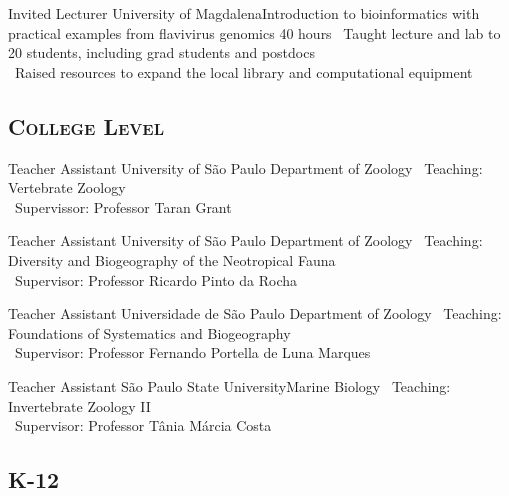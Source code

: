 \documentclass[11pt, letterpaper, sans]{moderncv}
\begin{document}
\vspace{.5em}

	{Invited Lecturer}
	{University of Magdalena}{Introduction to bioinformatics with practical examples from flavivirus genomics}
	{40 hours}
	{
		\textbullet~Taught lecture and lab to 20 students, including grad students and postdocs\\
		\textbullet~Raised resources to expand the local library and computational equipment
	}

	\subsection{\textsc{College Level}}
\vspace{.5em}

	{Teacher Assistant}
	{University of São Paulo}
	{Department of Zoology}
	{}
	{
		\textbullet~Teaching: Vertebrate Zoology\\
		\textbullet~Supervissor: Professor Taran Grant
	}

\vspace{.5em}

	{Teacher Assistant}
	{University of São Paulo}
	{Department of Zoology}
	{}
	{\textbullet~Teaching: Diversity and Biogeography of the Neotropical Fauna\\\textbullet~Supervisor: Professor Ricardo Pinto da Rocha
	}

\vspace{.5em}

	{Teacher Assistant}
	{Universidade de São Paulo}
	{Department of Zoology}
	{}
	{\textbullet~Teaching: Foundations of Systematics and Biogeography\\
		\textbullet~Supervisor: Professor Fernando Portella de Luna Marques
	}

\vspace{.5em}

	{Teacher Assistant}
	{São Paulo State University}{Marine Biology}
	{}
	{
		\textbullet~Teaching: Invertebrate Zoology II\\
		\textbullet~Supervisor: Professor Tânia Márcia Costa
	}

\vspace{.5em}
	\subsection{\textsc{K-12}}
\vspace{.5em}
\end{document}
